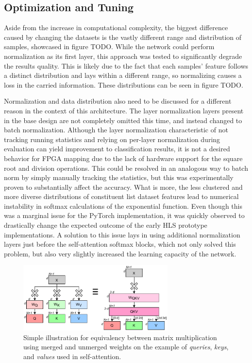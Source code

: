 \subsection{Optimization and Tuning}
Aside from the increase in computational complexity, the biggest difference caused by changing the datasets is the vastly different range and distribution of samples, showcased in figure TODO. While the network could perform normalization as its first layer, this approach was tested to significantly degrade the results quality. This is likely due to the fact that each samples' feature follows a distinct distribution and lays within a different range, so normalizing causes a loss in the carried information. These distributions can be seen in figure TODO. 

Normalization and data distribution also need to be discussed for a different reason in the context of this architecture. The layer normalization layers present in the base design are not completely omitted this time, and instead changed to batch normalization. Although the layer normalization characteristic of not tracking running statistics and relying on per-layer normalization during evaluation can yield improvement to classification results, it is not a desired behavior for FPGA mapping due to the lack of hardware support for the square root and division operations. This could be resolved in an analogous way to batch norm by simply manually tracking the statistics, but this was experimentally proven to substantially affect the accuracy. What is more, the less clustered and more diverse distributions of constituent list dataset features lead to numerical instability in softmax calculations of the exponential function. Even though this was a marginal issue for the PyTorch implementation, it was quickly observed to drastically change the expected outcome of the early HLS prototype implementations. A solution to this issue lays in using additional normalization layers just before the self-attention softmax blocks, which not only solved this problem, but also very slightly increased the learning capacity of the network.

\begin{figure}[hpt!]
  \centering
  \includegraphics[trim={0cm 0cm 0cm 0cm}, width=0.7\textwidth, center]{models/weight_merging.pdf}
  \caption{Simple illustration for equivalency between matrix multiplication using merged and unmerged weights on the example of \textit{queries}, \textit{keys}, and \textit{values} used in self-attention.}
  \label{fig:weight-merging}
\end{figure}

